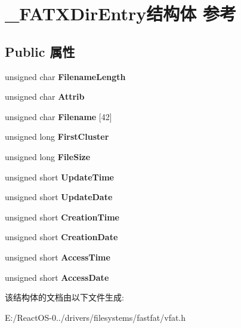 \hypertarget{struct___f_a_t_x_dir_entry}{}\section{\+\_\+\+F\+A\+T\+X\+Dir\+Entry结构体 参考}
\label{struct___f_a_t_x_dir_entry}
\subsection*{Public 属性}
\begin{DoxyCompactItemize}
\item 
\mbox{\label{struct___f_a_t_x_dir_entry_accfc4b07b9c430caf23a1a9f23bf17f9}} 
unsigned char {\bfseries Filename\+Length}
\item 
\mbox{\label{struct___f_a_t_x_dir_entry_a25e6993e2aed59cb107e465e43868355}} 
unsigned char {\bfseries Attrib}
\item 
\mbox{\label{struct___f_a_t_x_dir_entry_ac20860864ccf40b836a0169714da53d6}} 
unsigned char {\bfseries Filename} \mbox{[}42\mbox{]}
\item 
\mbox{\label{struct___f_a_t_x_dir_entry_abbf9c6ff49a313c2784244f622942f4b}} 
unsigned long {\bfseries First\+Cluster}
\item 
\mbox{\label{struct___f_a_t_x_dir_entry_a8539b59cb802269294f9d34e06b3178b}} 
unsigned long {\bfseries File\+Size}
\item 
\mbox{\label{struct___f_a_t_x_dir_entry_abffaea9fd67fd6a48daa19ec16d91129}} 
unsigned short {\bfseries Update\+Time}
\item 
\mbox{\label{struct___f_a_t_x_dir_entry_a4e67328e4b92ada00569f2877e525e97}} 
unsigned short {\bfseries Update\+Date}
\item 
\mbox{\label{struct___f_a_t_x_dir_entry_afaae9251013dadcd174a11443bbd223c}} 
unsigned short {\bfseries Creation\+Time}
\item 
\mbox{\label{struct___f_a_t_x_dir_entry_a9e05971487646983d6ef19b3a243fbf7}} 
unsigned short {\bfseries Creation\+Date}
\item 
\mbox{\label{struct___f_a_t_x_dir_entry_a05d3778dbd394297c613d7d1cef1f6d2}} 
unsigned short {\bfseries Access\+Time}
\item 
\mbox{\label{struct___f_a_t_x_dir_entry_a4672e2db31fd4314ba45bca0a913586f}} 
unsigned short {\bfseries Access\+Date}
\end{DoxyCompactItemize}


该结构体的文档由以下文件生成\+:\begin{DoxyCompactItemize}
\item 
E\+:/\+React\+O\+S-\/0../drivers/filesystems/fastfat/vfat.\+h\end{DoxyCompactItemize}

